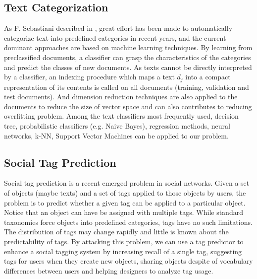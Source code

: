 
\subsection{Text Categorization}

As F. Sebastiani described in \cite{DBLP:journals/csur/Sebastiani02}, great effort has been made to automatically categorize text into predefined categories in recent years, and the current dominant approaches are based on machine learning techniques. By learning from preclassified documents, a classifier can grasp the characteristics of the categories and predict the classes of new documents. 
As texts cannot be directly interpreted by a classifier, an indexing procedure which maps a text $d_j$ into a compact representation of its contents is called on all documents (training, validation and test documents). And dimension reduction techniques are also applied to the documents to reduce the size of vector space and can also contributes to reducing overfitting problem. Among the text classifiers most frequently used, decision tree, probabilistic classifiers (e.g. Naive Bayes), regression methods, neural networks, k-NN, Support Vector Machines can be applied to our problem.

\subsection{Social Tag Prediction}
Social tag prediction \cite{DBLP:conf/sigir/HeymannRG08} is a recent emerged problem in social networks. Given a set of objects (maybe texts) and a set of tags applied to those objects by users, the problem is to predict whether a given tag can be applied to a particular object. Notice that an object can have be assigned with multiple tags. While standard taxonomies force objects into predefined categories, tags have no such limitations. The distribution of tags may change rapidly and little is known about the predictability of tags. By attacking this problem, we can use a tag predictor to enhance a social tagging system by increasing recall of a single tag, suggesting tags for users when they create new objects, sharing objects despite of vocabulary differences between users and helping designers to analyze tag usage.